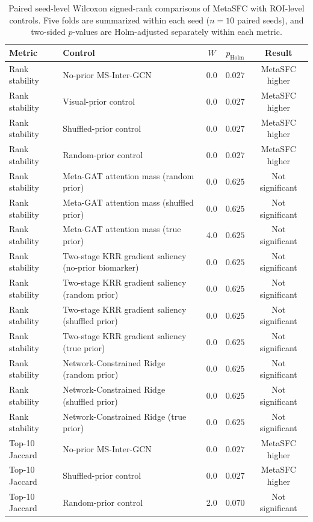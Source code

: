 \begin{table}[t]
\centering
\small
\caption{Paired seed-level Wilcoxon signed-rank comparisons of MetaSFC with ROI-level controls. Five folds are summarized within each seed ($n=10$ paired seeds), and two-sided $p$-values are Holm-adjusted separately within each metric.}
\label{tab:biomarker_wilcoxon}
\begin{tabular}{llccc}
\toprule
Metric & Control & $W$ & $p_{\mathrm{Holm}}$ & Result \\
\midrule
Rank stability & No-prior MS-Inter-GCN & 0.0 & $0.027$ & MetaSFC higher \\
Rank stability & Visual-prior control & 0.0 & $0.027$ & MetaSFC higher \\
Rank stability & Shuffled-prior control & 0.0 & $0.027$ & MetaSFC higher \\
Rank stability & Random-prior control & 0.0 & $0.027$ & MetaSFC higher \\
Rank stability & Meta-GAT attention mass (random prior) & 0.0 & $0.625$ & Not significant \\
Rank stability & Meta-GAT attention mass (shuffled prior) & 0.0 & $0.625$ & Not significant \\
Rank stability & Meta-GAT attention mass (true prior) & 4.0 & $0.625$ & Not significant \\
Rank stability & Two-stage KRR gradient saliency (no-prior biomarker) & 0.0 & $0.625$ & Not significant \\
Rank stability & Two-stage KRR gradient saliency (random prior) & 0.0 & $0.625$ & Not significant \\
Rank stability & Two-stage KRR gradient saliency (shuffled prior) & 0.0 & $0.625$ & Not significant \\
Rank stability & Two-stage KRR gradient saliency (true prior) & 0.0 & $0.625$ & Not significant \\
Rank stability & Network-Constrained Ridge (random prior) & 0.0 & $0.625$ & Not significant \\
Rank stability & Network-Constrained Ridge (shuffled prior) & 0.0 & $0.625$ & Not significant \\
Rank stability & Network-Constrained Ridge (true prior) & 0.0 & $0.625$ & Not significant \\
Top-10 Jaccard & No-prior MS-Inter-GCN & 0.0 & $0.027$ & MetaSFC higher \\
Top-10 Jaccard & Shuffled-prior control & 0.0 & $0.027$ & MetaSFC higher \\
Top-10 Jaccard & Random-prior control & 2.0 & $0.070$ & Not significant \\

\end{tabular}
\end{table}
